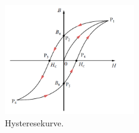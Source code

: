 \begin{figure}
  \centering
  \includegraphics[width=0.5\textwidth]{pics/hystereskurve.png}
  \caption{Hysteresekurve. \cite{hyste}}
  \label{fig: hyste}
\end{figure}
